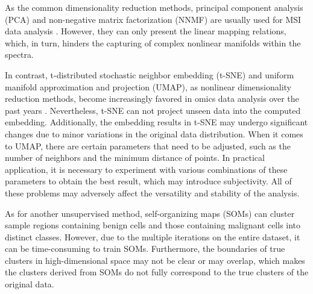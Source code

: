\documentclass{WileyMSP-template}
\begin{document}
As the common dimensionality reduction methods, 
principal component analysis (PCA) and non-negative matrix factorization (NNMF) 
are usually used for MSI data 
analysis \cite{race2013memory} \cite{jones2011multiple}. 
However, they can only present the 
linear mapping relations, which, 
in turn, hinders the capturing of complex 
nonlinear manifolds within the spectra. 

In contrast, t-distributed stochastic neighbor embedding (t-SNE) and 
uniform manifold approximation and projection (UMAP), 
as nonlinear dimensionality reduction methods, 
become increasingly favored in omics data analysis over the past years 
\cite{van2008visualizing} \cite{shekhar2014automatic} \cite{inglese2017deep}. 
Nevertheless, t-SNE can not project 
unseen data into the computed embedding. 
Additionally, the embedding results in t-SNE 
may undergo significant changes 
due to minor variations in the original data distribution. 
When it comes to UMAP, there are certain parameters that need to be 
adjusted, such as the number of neighbors and the minimum distance of points. 
In practical application, it is necessary to 
experiment with various combinations of these parameters to obtain 
the best result, which may introduce subjectivity. 
All of these problems may adversely affect the versatility 
and stability of the analysis. 

As for another unsupervised method, self-organizing 
maps (SOMs) \cite{nobile2023unsupervised}  can 
cluster sample regions containing benign cells and those containing malignant 
cells into distinct classes. However, due to the multiple iterations 
on the entire dataset, it can be time-consuming to train SOMs. 
Furthermore, the boundaries of true 
clusters in high-dimensional space may not be clear or may overlap, 
which makes the clusters derived from  
SOMs do not fully correspond to the true clusters of the original data.
 
  
\end{document}
